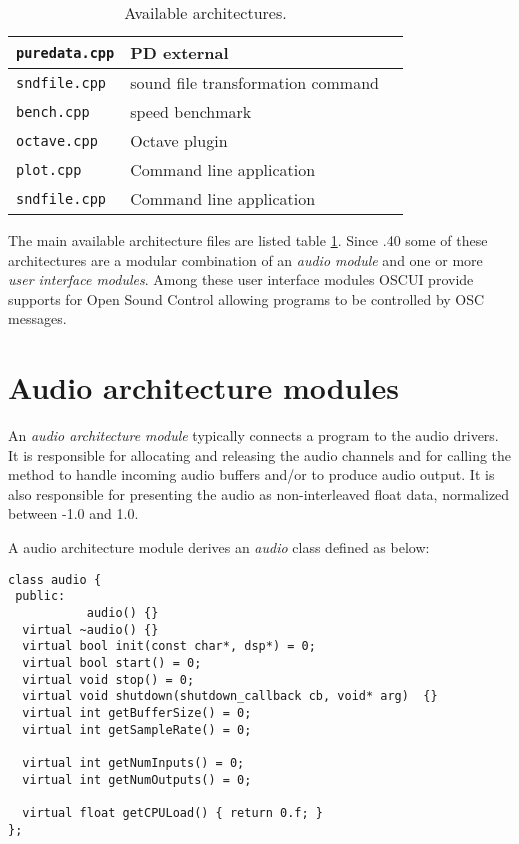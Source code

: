 \begin{table}[htp]
\begin{center}
\begin{tabular}{|l|l|l|}
\texttt{puredata.cpp} 		& PD external  \\
\hline
\texttt{sndfile.cpp} 		& sound file transformation command \\
\texttt{bench.cpp} 		& speed benchmark   \\
\texttt{octave.cpp} 		& Octave plugin   \\
\texttt{plot.cpp} 			& Command line application    \\
\texttt{sndfile.cpp} 		& Command line application    \\
\hline
\end{tabular}
\end{center}
\caption{Available architectures.}
\label{tab:availablearch}
\end{table}%

The main available architecture files are listed table \ref{tab:availablearch}. Since .40 some of these architectures are a modular combination of an \emph{audio module} and one or more \emph{user interface modules}. Among these user interface modules OSCUI provide supports for Open Sound Control allowing \faust programs to be controlled by OSC messages. 

\section{Audio architecture modules} 
An \emph{audio architecture module} typically connects a \faust program to the audio drivers.
It is responsible for allocating and releasing the audio channels and for calling the \faust {} method to handle incoming audio buffers and/or to produce audio output. It is also responsible for presenting the audio as non-interleaved float data, normalized between -1.0 and 1.0.

A \faust audio architecture module derives an \emph{audio} class defined as below:
\begin{lstlisting}[basicstyle=\ttfamily\footnotesize\color{yotxt}]
class audio {
 public:
           audio() {}
  virtual ~audio() {}
  virtual bool init(const char*, dsp*) = 0;
  virtual bool start() = 0;
  virtual void stop() = 0;
  virtual void shutdown(shutdown_callback cb, void* arg)  {}
  virtual int getBufferSize() = 0;
  virtual int getSampleRate() = 0;
    
  virtual int getNumInputs() = 0;
  virtual int getNumOutputs() = 0;
    
  virtual float getCPULoad() { return 0.f; }
};
\end{lstlisting} 


